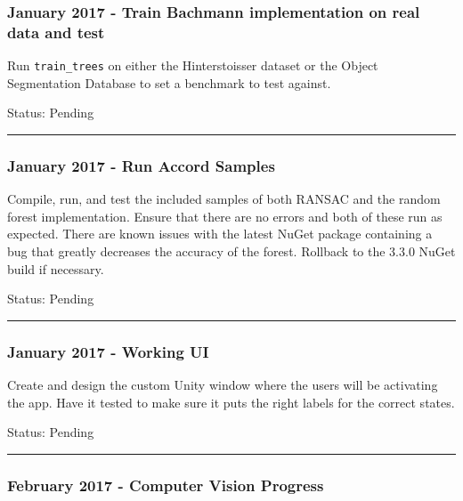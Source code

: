 \documentclass[12pt]{article}
\begin{document}
\subsubsection{January 2017 - Train Bachmann implementation on real data
and
test}\label{january-2017---train-bachmann-implementation-on-real-data-and-test}

Run \texttt{train\_trees} on either the Hinterstoisser dataset or the
Object Segmentation Database to set a benchmark to test against.

Status: Pending

\begin{center}\rule{0.5\linewidth}{\linethickness}\end{center}

\subsubsection{January 2017 - Run Accord
Samples}\label{january-2017---run-accord-samples}

Compile, run, and test the included samples of both RANSAC and the
random forest implementation. Ensure that there are no errors and both
of these run as expected. There are known issues with the latest NuGet
package containing a bug that greatly decreases the accuracy of the
forest. Rollback to the 3.3.0 NuGet build if necessary.

Status: Pending

\begin{center}\rule{0.5\linewidth}{\linethickness}\end{center}

\subsubsection{January 2017 - Working
UI}\label{january-2017---working-ui}

Create and design the custom Unity window where the users will be
activating the app. Have it tested to make sure it puts the right labels
for the correct states.

Status: Pending

\begin{center}\rule{0.5\linewidth}{\linethickness}\end{center}

\subsubsection{February 2017 - Computer Vision
Progress}\label{february-2017---computer-vision-progress}
\end{document}
